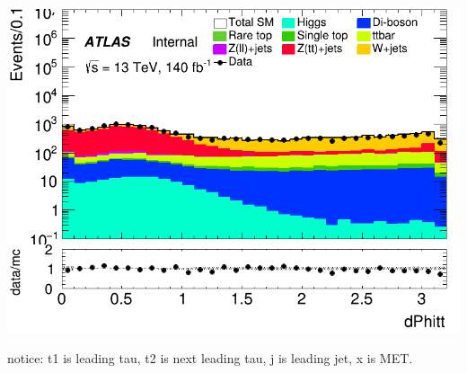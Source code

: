 \documentclass[usenames,dvipsnames]{beamer}
\begin{document}
\begin{frame}
\begin{minipage}{0.32\textwidth}
        \includegraphics[width=\textwidth]{graphics/HH_met/HH_met_dPhitt.png}
    \end{minipage}
    notice: t1 is leading tau, t2 is next leading tau, j is leading jet, x is MET.
\end{frame}
\end{document}
